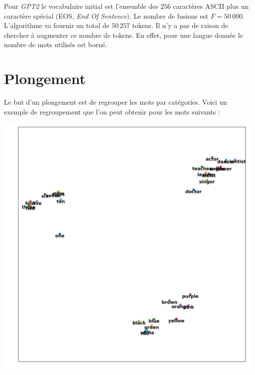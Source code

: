 \documentclass[11pt,class=report,crop=false]{standalone}
\begin{document}
Pour \emph{GPT2} le vocabulaire initial est l'ensemble des $256$ caractères ASCII plus un caractère spécial (EOS, \emph{End Of Sentence}).
Le nombre de fusions est $F=50\,000$. L'algorithme va fournir un total de $50\,257$ tokens.
Il n'y a pas de raison de chercher à augmenter ce nombre de tokens. En effet, pour une langue donnée le nombre de mots utilisés est borné.




\section{Plongement}

Le but d'un plongement est de regrouper les mots par catégories.
Voici un exemple de regroupement que l'on peut obtenir pour les mots suivants :



\begin{center}
	\includegraphics[scale=\myscale,scale=0.3]{figures/projection-pca-0.png}
\end{center}
\end{document}
